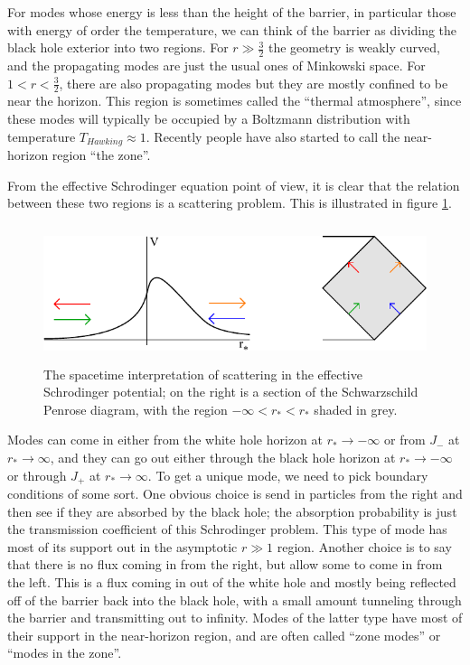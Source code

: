 \documentclass[12pt]{article}
\begin{document}
For modes whose energy is less than the height of the barrier, in particular those with energy of order the temperature, we can think of the barrier as dividing the black hole exterior into two regions.  For $r\gg \frac{3}{2}$ the geometry is weakly curved, and the propagating modes are just the usual ones of Minkowski space.  For $1<r<\frac{3}{2}$, there are also propagating modes but they are mostly confined to be near the horizon.  This region is sometimes called the ``thermal atmosphere'', since these modes will typically be occupied by a Boltzmann distribution with temperature $T_{Hawking}\approx 1$.  Recently people have also started to call the near-horizon region ``the zone''.  

From the effective Schrodinger equation point of view, it is clear that the relation between these two regions is a scattering problem. This is illustrated in figure \ref{schscat}.
\begin{figure}
\begin{center}
\includegraphics[height=4cm]{schscat.pdf}
\caption{The spacetime interpretation of scattering in the effective Schrodinger potential; on the right is a section of the Schwarzschild Penrose diagram, with the region $-\infty<r_*<r_*$ shaded in grey.}\label{schscat}
\end{center}
\end{figure}
Modes can come in either from the white hole horizon at $r_*\to -\infty$ or from $J_-$ at $r_*\to \infty$, and they can go out either through the black hole horizon at $r_*\to -\infty$ or through $J_+$ at $r_* \to \infty$.  To get a unique mode, we need to pick boundary conditions of some sort.  One obvious choice is send in particles from the right and then see if they are absorbed by the black hole; the absorption probability is just the transmission coefficient of this Schrodinger problem.  This type of mode has most of its support out in the asymptotic $r\gg 1$ region.  Another choice is to say that there is no flux coming in from the right, but allow some to come in from the left. This is a flux coming in out of the white hole and mostly being reflected off of the barrier back into the black hole, with a small amount tunneling through the barrier and transmitting out to infinity.  Modes of the latter type have most of their support in the near-horizon region, and are often called ``zone modes'' or ``modes in the zone''.  
\end{document}
